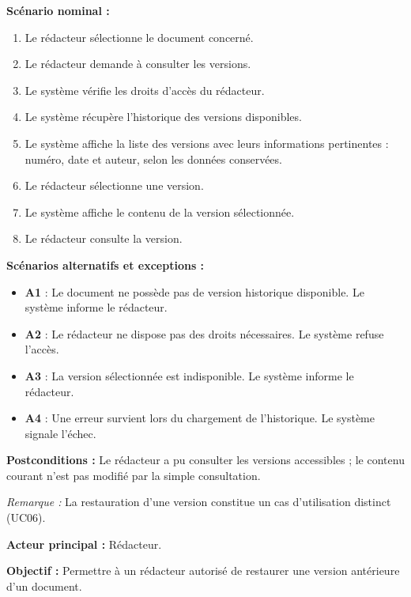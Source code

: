 \begin{description}[leftmargin=0pt, style=nextline, font=\normalfont\bfseries\color{violetprincipal}]
    \textbf{Scénario nominal :}
    \begin{enumerate}
        \item Le rédacteur sélectionne le document concerné.
        \item Le rédacteur demande à consulter les versions.
        \item Le système vérifie les droits d'accès du rédacteur.
        \item Le système récupère l'historique des versions disponibles.
        \item Le système affiche la liste des versions avec leurs informations pertinentes : numéro, date et auteur, selon les données conservées.
        \item Le rédacteur sélectionne une version.
        \item Le système affiche le contenu de la version sélectionnée.
        \item Le rédacteur consulte la version.
    \end{enumerate}

    \textbf{Scénarios alternatifs et exceptions :}
    \begin{itemize}
        \item \textbf{A1} : Le document ne possède pas de version historique disponible. Le système informe le rédacteur.
        \item \textbf{A2} : Le rédacteur ne dispose pas des droits nécessaires. Le système refuse l'accès.
        \item \textbf{A3} : La version sélectionnée est indisponible. Le système informe le rédacteur.
        \item \textbf{A4} : Une erreur survient lors du chargement de l'historique. Le système signale l'échec.
    \end{itemize}

    \textbf{Postconditions :} Le rédacteur a pu consulter les versions accessibles ; le contenu courant n'est pas modifié par la simple consultation.

    \textit{Remarque :} La restauration d'une version constitue un cas d'utilisation distinct (UC06).

    \item[UC06 --- Restaurer une version]

    \textbf{Acteur principal :} Rédacteur.

    \textbf{Objectif :} Permettre à un rédacteur autorisé de restaurer une version antérieure d'un document.


\end{description}

